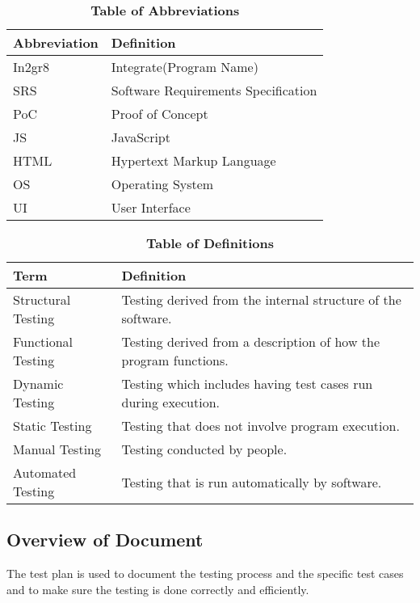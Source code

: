 \documentclass[12pt, titlepage]{article}
\begin{document}
	
\begin{table}[hbp]
\caption{\textbf{Table of Abbreviations}} \label{Table}

\begin{tabularx}{\textwidth}{p{3cm}X}
\toprule
\textbf{Abbreviation} & \textbf{Definition} \\
\midrule
In2gr8 & Integrate(Program Name)\\
SRS & Software Requirements Specification\\
PoC & Proof of Concept\\
JS & JavaScript\\
HTML & Hypertext Markup Language\\
OS & Operating System\\
UI & User Interface\\
\bottomrule
\end{tabularx}

\end{table}

\begin{table}[!htbp]
\caption{\textbf{Table of Definitions}} \label{Table}

\begin{tabularx}{\textwidth}{p{3cm}X}
\toprule
\textbf{Term} & \textbf{Definition}\\
\midrule
		Structural Testing & Testing derived from the internal structure of the software. \\
		Functional Testing & Testing derived from a description of how the program functions.  \\
		Dynamic Testing & Testing which includes having test cases run during execution. \\
		Static Testing & Testing that does not involve program execution.  \\
		Manual Testing & Testing conducted by people. \\
		Automated Testing & Testing that is run automatically by software. \\ 


\bottomrule
\end{tabularx}

\end{table}	

\subsection{Overview of Document}
The test plan is used to document the testing process and the specific test cases and to make sure the testing is done correctly and efficiently. 
\end{document}
